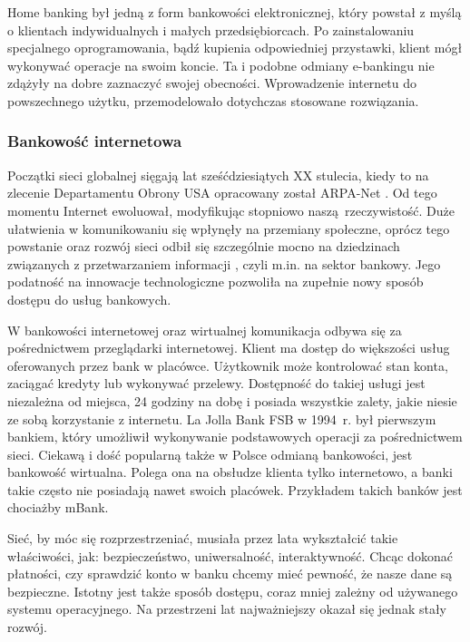 Home banking był jedną z form bankowości elektronicznej, który powstał z myślą o klientach indywidualnych i małych przedsiębiorcach. Po zainstalowaniu specjalnego oprogramowania, bądź kupienia odpowiedniej przystawki, klient mógł wykonywać operacje na swoim koncie. Ta i podobne odmiany e-bankingu nie zdążyły na dobre zaznaczyć swojej obecności. Wprowadzenie internetu do powszechnego użytku, przemodelowało dotychczas stosowane rozwiązania.

\subsubsection*{Bankowość internetowa}

Początki sieci globalnej sięgają lat sześćdziesiątych XX stulecia, kiedy to na zlecenie Departamentu Obrony USA opracowany został ARPA-Net \cite{pieniadz_elektroniczny-analiza}. Od tego momentu Internet ewoluował, modyfikując stopniowo naszą rzeczywistość. Duże ułatwienia w komunikowaniu się wpłynęły na przemiany społeczne, oprócz tego powstanie oraz rozwój sieci odbił się szczególnie mocno na dziedzinach związanych z przetwarzaniem informacji \cite{pieniadz_elektroniczny-analiza}, czyli m.in. na sektor bankowy. Jego podatność na innowacje technologiczne pozwoliła na zupełnie nowy sposób dostępu do usług bankowych.

W bankowości internetowej oraz wirtualnej komunikacja odbywa się za pośrednictwem przeglądarki internetowej. Klient ma dostęp do większości usług oferowanych przez bank w placówce. Użytkownik może kontrolować stan konta, zaciągać kredyty lub wykonywać przelewy. Dostępność do takiej usługi jest niezależna od miejsca, 24 godziny na dobę i posiada wszystkie zalety, jakie niesie ze sobą korzystanie z internetu. La Jolla Bank FSB w 1994~r. był pierwszym bankiem, który umożliwił wykonywanie podstawowych operacji za pośrednictwem sieci. Ciekawą i dość popularną także w Polsce odmianą bankowości, jest bankowość wirtualna. Polega ona na obsłudze klienta tylko internetowo, a banki takie często nie posiadają nawet swoich placówek. Przykładem takich banków jest chociażby mBank. 

Sieć, by móc się rozprzestrzeniać, musiała przez lata wykształcić takie właściwości, jak: bezpieczeństwo, uniwersalność, interaktywność. Chcąc dokonać płatności, czy sprawdzić konto w banku chcemy mieć pewność, że nasze dane są bezpieczne. Istotny jest także sposób dostępu, coraz mniej zależny od używanego systemu operacyjnego. Na przestrzeni lat najważniejszy okazał się jednak stały rozwój. 

